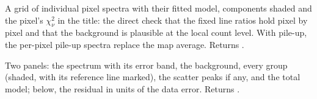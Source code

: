 A grid of individual pixel spectra with their fitted model, components shaded and the
pixel's $\chi^2_\nu$ in the title: the direct check that the fixed line ratios hold pixel by
pixel and that the background is plausible at the local count level. With pile-up, the
per-pixel pile-up spectra replace the map average. Returns .

Two panels: the spectrum with its error band, the background, every group (shaded, with its
reference line marked), the scatter peaks if any, and the total model; below, the residual in
units of the data error. Returns .
